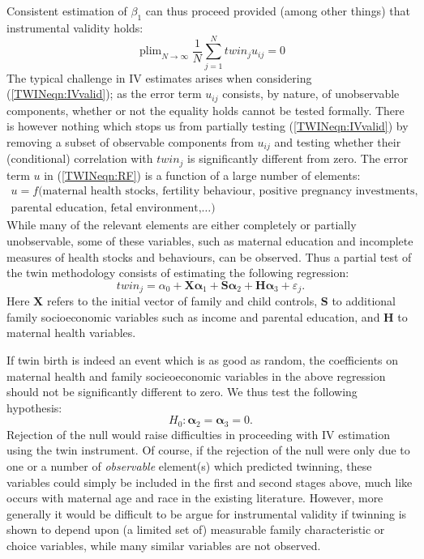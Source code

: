 \documentclass[subeqn]{article}
\DeclareMathOperator{\plim}{plim}
\begin{document}
\begin{spacing}{1.4}
Consistent estimation of $\beta_1$ can thus proceed provided (among other
things) that instrumental validity holds:
\begin{equation}
\label{TWINeqn:IVvalid}
\plim_{N\to \infty} \frac{1}{N}\sum_{j=1}^N twin_ju_{ij}=0
\end{equation}
The typical challenge in IV estimates arises when considering 
(\ref{TWINeqn:IVvalid}); as the error term $u_{ij}$ consists, by nature, of 
unobservable components, whether or not the equality holds cannot be tested 
formally.  There is however nothing which stops us from partially testing 
(\ref{TWINeqn:IVvalid}) by removing a subset of observable components from $u_{ij}$
and testing whether their (conditional) correlation with $twin_j$ is 
significantly different from zero. The error term $u$ in (\ref{TWINeqn:RF}) 
is a function of a large number of elements:
\begin{equation}
\label{TWINeqn:IVbias}
\begin{split}
u=f(\text{maternal health stocks, fertility behaviour, positive pregnancy investments,}  \\
\text{parental education, fetal environment,}\ldots)
\end{split}
\end{equation}
While many of the relevant elements are either completely or partially 
unobservable, some of these variables, such as maternal education and 
incomplete measures of health stocks and behaviours, can be observed.  Thus a 
partial test of the twin methodology consists of estimating the following 
regression:
\begin{equation}
\label{TWINeqn:twinreg}
twin_{j}=\alpha_0 + \bm{X}\bm{\alpha}_1 + \bm{S}\bm{\alpha}_2
                  + \bm{H}\bm{\alpha}_3 + \varepsilon_{j}.
\end{equation}
Here $\bm{X}$ refers to the initial vector of family and child controls, $\bm{S}$
to additional family socioeconomic variables such as income and parental 
education, and $\bm{H}$ to maternal health variables.  

If twin birth is indeed an event which is as good as random, the coefficients
on maternal health and family socieoeconomic variables in the above regression
should not be significantly different to zero.  We thus test the following 
hypothesis:
\begin{equation}
\label{TWINeqn:twintest}
H_0: \bm{\alpha}_2 = \bm{\alpha}_3 = 0.
\end{equation}
Rejection of the null would raise difficulties in proceeding with IV estimation 
using the twin instrument. Of course, if the rejection of the null were only due 
to one or a number of \emph{observable} element(s) which predicted twinning, 
these variables could simply be included in the first and second stages above, 
much like occurs with maternal age and race in the existing literature.  However, 
more generally it would be difficult to be argue for instrumental validity if 
twinning is shown to depend upon (a limited set of) measurable family 
characteristic or choice variables, while many similar variables are not observed.


\end{spacing}
\end{document}
